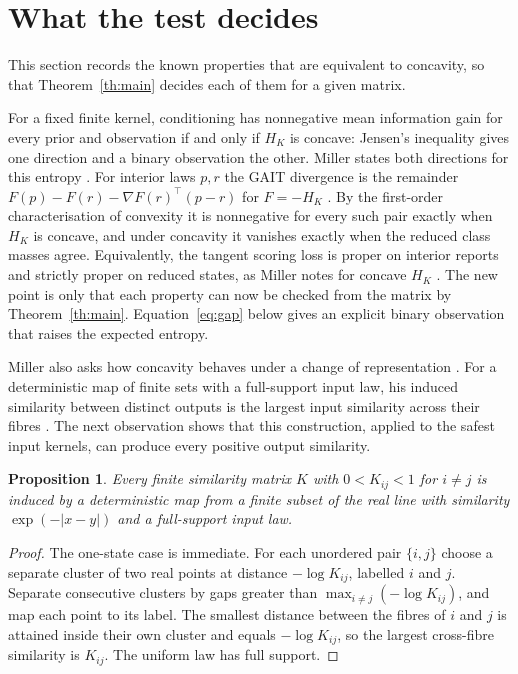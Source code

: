 \documentclass[11pt,a4paper]{article}
\newtheorem{proposition}[theorem]{Proposition}
\theoremstyle{remark}
\begin{document}
\section{What the test decides}\label{sec:consequences}
This section records the known properties that are equivalent to concavity, so that Theorem~\ref{th:main} decides each of them for a given matrix.

For a fixed finite kernel, conditioning has nonnegative mean information gain for every prior and observation if and only if $H_K$ is concave: Jensen's inequality gives one direction and a binary observation the other. Miller states both directions for this entropy \cite[Section 4.1 and Lemma A.1]{miller}. For interior laws $p,r$ the GAIT divergence is the remainder $F(p)-F(r)-\nabla F(r)^\top(p-r)$ for $F=-H_K$ \cite[Definition 2]{gait}. By the first-order characterisation of convexity it is nonnegative for every such pair exactly when $H_K$ is concave, and under concavity it vanishes exactly when the reduced class masses agree. Equivalently, the tangent scoring loss is proper on interior reports and strictly proper on reduced states, as Miller notes for concave $H_K$ \cite[Section 6.2]{miller}. The new point is only that each property can now be checked from the matrix by Theorem~\ref{th:main}. Equation~\eqref{eq:gap} below gives an explicit binary observation that raises the expected entropy.

Miller also asks how concavity behaves under a change of representation \cite[Section 6.2]{miller}. For a deterministic map of finite sets with a full-support input law, his induced similarity between distinct outputs is the largest input similarity across their fibres \cite[Definition 3.3]{miller}. The next observation shows that this construction, applied to the safest input kernels, can produce every positive output similarity.

\begin{proposition}\label{prop:induced}
Every finite similarity matrix $K$ with $0<K_{ij}<1$ for $i\ne j$ is induced by a deterministic map from a finite subset of the real line with similarity $\exp(-|x-y|)$ and a full-support input law.
\end{proposition}
\begin{proof}
The one-state case is immediate. For each unordered pair $\{i,j\}$ choose a separate cluster of two real points at distance $-\log K_{ij}$, labelled $i$ and $j$. Separate consecutive clusters by gaps greater than $\max_{i\ne j}(-\log K_{ij})$, and map each point to its label. The smallest distance between the fibres of $i$ and $j$ is attained inside their own cluster and equals $-\log K_{ij}$, so the largest cross-fibre similarity is $K_{ij}$. The uniform law has full support.
\end{proof}
\end{document}

